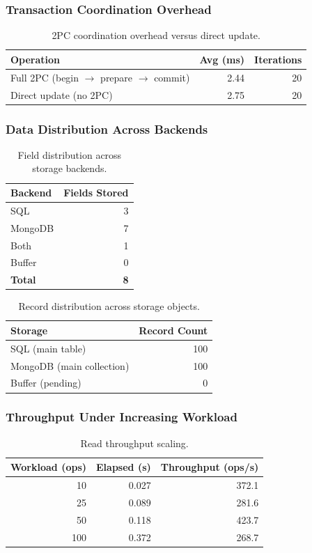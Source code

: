 \documentclass[12pt,a4paper]{article}
\begin{document}
\subsubsection{Transaction Coordination Overhead}
\begin{table}[H]
\centering
\begin{tabular}{l r r}
\toprule
\textbf{Operation} & \textbf{Avg (ms)} & \textbf{Iterations} \\
\midrule
Full 2PC (begin $\rightarrow$ prepare $\rightarrow$ commit) & 2.44 & 20 \\
Direct update (no 2PC) & 2.75 & 20 \\
\bottomrule
\end{tabular}
\caption{2PC coordination overhead versus direct update.}
\end{table}

\subsubsection{Data Distribution Across Backends}
\begin{table}[H]
\centering
\begin{tabular}{l r}
\toprule
\textbf{Backend} & \textbf{Fields Stored} \\
\midrule
SQL & 3 \\
MongoDB & 7 \\
Both & 1 \\
Buffer & 0 \\
\textbf{Total} & \textbf{8} \\
\bottomrule
\end{tabular}
\caption{Field distribution across storage backends.}
\end{table}

\begin{table}[H]
\centering
\begin{tabular}{l r}
\toprule
\textbf{Storage} & \textbf{Record Count} \\
\midrule
SQL (main table) & 100 \\
MongoDB (main collection) & 100 \\
Buffer (pending) & 0 \\
\bottomrule
\end{tabular}
\caption{Record distribution across storage objects.}
\end{table}

\subsubsection{Throughput Under Increasing Workload}
\begin{table}[H]
\centering
\begin{tabular}{r r r}
\toprule
\textbf{Workload (ops)} & \textbf{Elapsed (s)} & \textbf{Throughput (ops/s)} \\
\midrule
10 & 0.027 & 372.1 \\
25 & 0.089 & 281.6 \\
50 & 0.118 & 423.7 \\
100 & 0.372 & 268.7 \\
\bottomrule
\end{tabular}
\caption{Read throughput scaling.}
\end{table}
\end{document}
